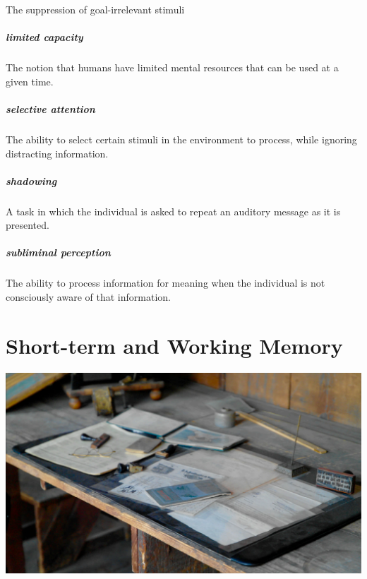 \documentclass[
]{krantz}
\begin{document}
The suppression of goal-irrelevant stimuli

\paragraph*{limited capacity}\label{limited-capacity}

The notion that humans have limited mental resources that can be used at a given time.

\paragraph*{selective attention}\label{selective-attention-1}

The ability to select certain stimuli in the environment to process, while ignoring distracting information.

\paragraph*{shadowing}\label{shadowing}

A task in which the individual is asked to repeat an auditory message as it is presented.

\paragraph*{subliminal perception}\label{subliminal-perception-1}

The ability to process information for meaning when the individual is not consciously aware of that information.

\chapter{Short-term and Working Memory}\label{working-memory-chapter}

\begin{center}\includegraphics[width=1\linewidth]{images/ch4/fig0} \end{center}
\end{document}
